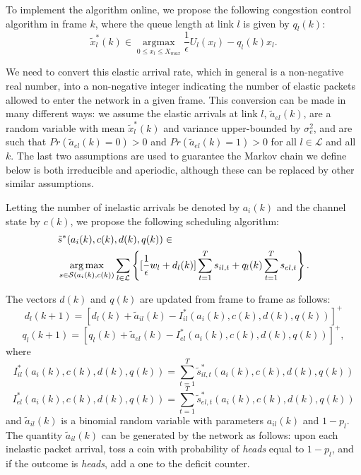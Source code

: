 \documentclass[conference]{IEEEtran}
\begin{document}
To implement the algorithm online, we propose the following congestion control algorithm in frame $k$, where the queue length at link $l$ is given by $q_l(k)$:
\begin{equation}
\label{online_opt_cc_kc}
	\tilde{x}_l^*(k) \in \mathop{\arg\max}\limits_{ 0 \leq x_l \leq X_{max} } \frac{1}{\epsilon} U_l(x_l) - q_l(k) x_l.
\end{equation}

We need to convert this elastic arrival rate, which in general is a non-negative real number, into a non-negative integer indicating the number of elastic packets allowed to enter the network in a given frame. This conversion can be made in many different ways: we assume the elastic arrivals at link $l$, $\tilde{a}_{el}(k)$, are a random variable with mean $\tilde{x}_l^*(k)$ and variance upper-bounded by $\sigma_{e}^2$, and are such that $Pr(\tilde{a}_{el}(k)=0)>0$ and $Pr(\tilde{a}_{el}(k)=1)>0$ for all $l \in \mathcal{L}$ and all $k$. The last two assumptions are used to guarantee the Markov chain we define below is both irreducible and aperiodic, although these can be replaced by other similar assumptions.

Letting the number of inelastic arrivals be denoted by $a_i(k)$ and the channel state by $c(k)$, we propose the following scheduling algorithm:
\begin{align}
	& \tilde{s}^*(a_i(k),c(k),d(k),q(k)) \in \label{online_opt_sch_kc} \\
	& \mathop{\arg\max}\limits_{s \in \mathcal{S}(a_i(k),c(k))} \sum\limits_{l \in \mathcal{L}} \left\{ [\frac{1}{\epsilon} w_l+d_l(k)] \sum_{t=1}^{T} s_{il,t} + q_l(k) \sum_{t=1}^{T} s_{el,t} \right\}. \notag
\end{align}

The vectors $d(k)$ and $q(k)$ are updated from frame to frame as follows:
\begin{equation*}
	d_l(k+1) = [ d_l(k) + \tilde{a}_{il}(k) - I_{il}^*(a_i(k),c(k),d(k),q(k))]^+
\end{equation*}
\begin{equation*}
	q_l(k+1) = [ q_l(k) + \tilde{a}_{el}(k) - I_{el}^*(a_i(k),c(k),d(k),q(k)) ]^+,
\end{equation*}
where
\begin{equation*}
	I_{il}^*(a_i(k),c(k),d(k),q(k)) = \sum_{t=1}^{T} \tilde{s}_{il,t}^*(a_i(k),c(k),d(k),q(k))
\end{equation*}
\begin{equation*}
	I_{el}^*(a_i(k),c(k),d(k),q(k)) = \sum_{t=1}^{T} \tilde{s}_{el,t}^*(a_i(k),c(k),d(k),q(k))
\end{equation*}
and $\tilde{a}_{il}(k)$ is a binomial random variable with parameters $a_{il}(k)$ and $1-p_l$. The quantity $\tilde{a}_{il}(k)$ can be generated by the network as follows: upon each inelastic packet arrival, toss a coin with probability of \emph{heads} equal to $1-p_l$, and if the outcome is \emph{heads}, add a one to the deficit counter.
\end{document}
